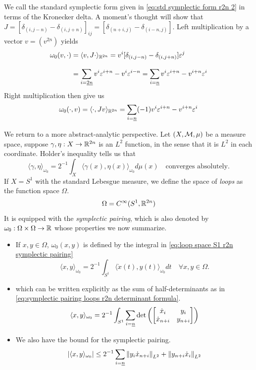 \documentclass[../main-v2-manifolds.tex]{subfiles}
\begin{document}
%
%
\begin{note}\label{note: symplectic form summation computations}
    We call the standard symplectic form given in \cref{eq:std symplectic form r2n 2} in terms of the Kronecker delta. A moment's thought will show that $J = [\delta_{(i,j-n)} - \delta_{(i,j+n)}]_{ij} = [\delta_{(n+i,j)} - \delta_{(i-n,j)}]$. Left multiplication by a vector $v = (v^{\underline{2n}})$ yields
    \begin{align*}
        \omega_0(v,\cdot) &= \langle v, J\cdot\rangle_{{\mathbb{R}^{2n}}} = v^i[\delta_{(i,j-n)} - \delta_{(i,j+n)}]\varepsilon^j\\[2ex]
        &=\sum_{i=\underline{2n}}v^i\varepsilon^{i+n} - v^i\varepsilon^{i-n} =\sum_{i=\underline{n}}v^i\varepsilon^{i+n} - v^{i+n}\varepsilon^{i}
    \end{align*}
    Right multiplication then give us 
    \[
        \omega_0(\cdot, v) = \langle \cdot,Jv\rangle_{{\mathbb{R}^{2n}}} = \sum_{i=\underline{n}}(-1)v^i\varepsilon^{i+n} - v^{i+n}\varepsilon^i
    \]
\end{note}
We return to a more abstract-analytic perspective. Let $(X,\mathcal{M},\mu)$ be a measure space, suppose $\gamma, \eta: X\to {\mathbb{R}^{2n}}$ is an $L^2$ function, in the sense that it is $L^2$ in each coordinate. Holder's inequality tells us that
\[
    \langle \gamma,\eta\rangle_{\omega_0} = 2^{-1}\int_{X}\langle \gamma(x),\eta (x)\rangle_{\omega_0} d\mu(x)\quad\text{converges absolutely.}
\]
If $X = S^1$ with the standard Lebesgue measure, we define the space of \emph{loops} as the function space $\Omega$.
\begin{equation}
    \Omega = C^\infty(S^1, {\mathbb{R}^{2n}})
    \label{eq:loop space S1 r2n}
\end{equation}
It is equipped with the \emph{symplectic pairing}, which is also denoted by $\omega_0:\Omega\times\Omega\to\mathbb{R}$ whose properties we now summarize.
\begin{itemize}
    \item If $x,y\in\Omega$, $\omega_0(x,y)$ is defined by the integral in \cref{eq:loop space S1 r2n symplectic pairing}
    \begin{equation}
        \langle x,y\rangle_{\omega_0}= 2^{-1}\int_{S^1} \langle \mathring{x}(t), y(t) \rangle_{\omega_0} dt\quad\forall x,y\in\Omega.
        \label{eq:loop space S1 r2n symplectic pairing}
    \end{equation}
    \item which can be written explicitly as the sum of half-determinants as in \cref{eq:symplectic pairing loops r2n determinant formula}.
    \begin{equation}
        \langle x,y\rangle_{\omega_0} = 2^{-1}\int_{S^1} \sum_{i=\underline{n}}\det\qty(\mqty[\dot{x}_i & y_i \\ \dot{x}_{n+i} & y_{n+i}])
        \label{eq:symplectic pairing loops r2n determinant formula}
    \end{equation}
    \item We also have the bound for the symplectic pairing.
    \[
        \vert {\langle x,y\rangle_{\omega_0}} \vert\leq 2^{-1}\sum_{i=\underline{n}}\norm{y_i\dot{x}_{n+i}}_{L^2} + \norm{y_{n+i}\dot{x}_{i}}_{L^2}
    \]    
\end{itemize}
\end{document}
